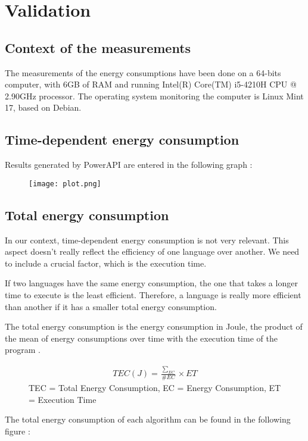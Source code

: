 \section{Validation}
\label{sec:Validation}

    \subsection{Context of the measurements}
        The measurements of the energy consumptions have been done on a 64-bits computer, with 6GB of RAM and running Intel(R) Core(TM) i5-4210H CPU @ 2.90GHz processor. The operating system monitoring the computer is Linux Mint 17, based on Debian.
	\subsection{Time-dependent energy consumption}
	Results generated by PowerAPI are entered in the following graph :
\begin{figure}[H]
	\texttt{[image: plot.png]}
\end{figure}

	\subsection{Total energy consumption}
	In our context, time-dependent energy consumption is not very relevant. This aspect doesn't really reflect the efficiency of one language over another. We need to include a crucial factor, which is the execution time.
	
	If two languages have the same energy consumption, the one that takes a longer time to execute is the least efficient. Therefore, a language is really more efficient than another if it has a smaller total energy consumption.
	
	The total energy consumption is the energy consumption in Joule, the product of the mean of energy consumptions over time with the execution time of the program \cite{joule}.
	
	\begin{figure}[H]
	\begin{gather*}
		TEC(J) = \frac{\sum\nolimits_{EC}}{\#EC} \times ET	
	\end{gather*}
	TEC = Total Energy Consumption, EC = Energy Consumption, ET = Execution Time
	\end{figure}
	
The total energy consumption of each algorithm can be found in the following figure :

